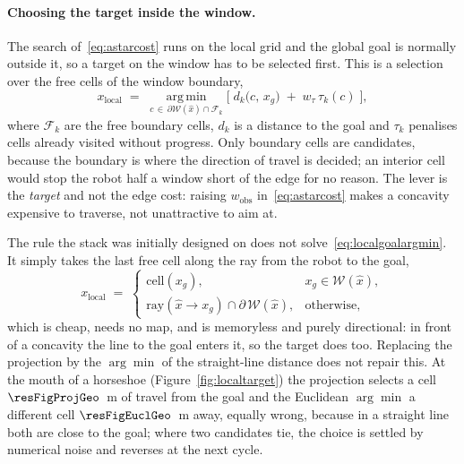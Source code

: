\documentclass[11pt,a4paper]{article}
\begin{document}
\paragraph{Choosing the target inside the window.} The search of~\eqref{eq:astarcost} runs on the local
grid and the global goal is normally outside it, so a target on the window has to be selected first. This
is a selection over the free cells of the window boundary,
\begin{equation}
  x_{\mathrm{local}} \;=\;
  \operatorname*{arg\,min}_{c\,\in\,\partial\mathcal{W}(\hat x)\cap\mathcal{F}_k}
  \Big[\; d_k\big(c,\,x_g\big) \;+\; w_\tau\,\tau_k(c) \;\Big],
  \label{eq:localgoalargmin}
\end{equation}
where $\mathcal{F}_k$ are the free boundary cells, $d_k$ is a distance to the goal and $\tau_k$ penalises
cells already visited without progress. Only boundary cells are candidates, because the boundary is where
the direction of travel is decided; an interior cell would stop the robot half a window short of the edge
for no reason. The lever is the \emph{target} and not the edge cost: raising
$w_{\mathrm{obs}}$ in~\eqref{eq:astarcost} makes a concavity expensive to traverse, not unattractive to aim
at.

The rule the stack was initially designed on does not solve~\eqref{eq:localgoalargmin}. It simply takes the last free
cell along the ray from the robot to the goal,
\begin{equation}
  x_{\mathrm{local}} \;=\;
  \begin{cases}
    \mathrm{cell}(x_g), & x_g\in\mathcal{W}(\hat x),\\[2pt]
    \mathrm{ray}(\hat x\!\rightarrow\! x_g)\cap\partial\,\mathcal{W}(\hat x), & \text{otherwise},
  \end{cases}
  \label{eq:localgoal}
\end{equation}
which is cheap, needs no map, and is memoryless and purely directional: in front of a concavity the line
to the goal enters it, so the target does too. Replacing the projection by the $\arg\min$ of the
straight-line distance does not repair this. At the mouth of a horseshoe (Figure~\ref{fig:localtarget}) the
projection selects a cell $\resFigProjGeo$~m of travel from the goal and the Euclidean $\arg\min$ a
different cell $\resFigEuclGeo$~m away, equally wrong, because in a straight line both are close to the
goal; where two candidates tie, the choice is settled by numerical noise and reverses at the next cycle.
\end{document}
